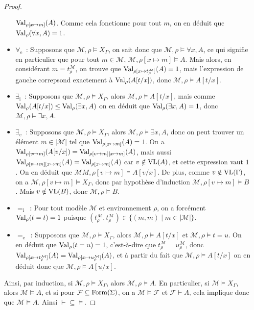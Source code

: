 \begin{proof}
\begin{itemize}
    $\operatorname{Val}_{\rho[x\mapsto m]}(A)$. Comme cela fonctionne pour tout $m$, on en
    déduit que $\operatorname{Val}_\rho(\forall x, A) = 1$.
  \item $\forall_\mathrm e$~: Supposons que $\mathcal M, \rho\models X_\Gamma$, on
    sait donc que $\mathcal M,\rho\models \forall x, A$, ce qui signifie en
    particulier que pour tout $m\in\mathcal M$,
    $\mathcal M,\rho[x\mapsto m]\models A$.
    Mais alors, en considérant $m = t^\mathcal M_\rho$, on trouve que
    $\operatorname{Val}_{\rho[x\mapsto t^\mathcal M_\rho]}(A) = 1$, mais l'expression de gauche
    correpsond exactement à $\operatorname{Val}_\rho(A[t/x])$, donc
    $\mathcal M,\rho\models A[t/x]$.
  \item $\exists_\mathrm i$~: Supposons que $\mathcal M,\rho\models X_\Gamma$,
    alors $\mathcal M,\rho\models A[t/x]$, mais comme
    $\operatorname{Val}_\rho(A[t/x])\leq\operatorname{Val}_\rho(\exists x,A)$ on en déduit que
    $\operatorname{Val}_\rho(\exists x,A) = 1$, donc $\mathcal M,\rho\models \exists x,A$.
  \item $\exists_\mathrm e$~: Supposons que $\mathcal M,\rho\models X_\Gamma$,
    alors $\mathcal M,\rho\models \exists x,A$, donc on peut trouver un élément
    $m\in|\mathcal M|$ tel que $\operatorname{Val}_{\rho[x\mapsto m]}(A) = 1$. On a
    $\operatorname{Val}_{\rho[v\mapsto m]}(A[v/x]) = \operatorname{Val}_{\rho[v\mapsto m][x\mapsto m]}(A)$, mais
    aussi $\operatorname{Val}_{\rho[v\mapsto m][x\mapsto m]}(A) = \operatorname{Val}_{\rho[x\mapsto m]}(A)$
    car $v\notin\operatorname{VL}(A)$, et cette expression vaut $1$. On en déduit que
    $\mathcal M M,\rho[v\mapsto m]\models A[v/x]$. De plus, comme
    $v\notin\operatorname{VL}(\Gamma)$, on a $\mathcal M,\rho[v\mapsto m]\models X_\Gamma$,
    donc par hypothèse d'induction $\mathcal M,\rho[v\mapsto m]\models B$.
    Mais $v\notin\operatorname{VL}(B)$, donc $\mathcal M,\rho\models B$.
  \item $=_\mathrm i$~: Pour tout modèle $\mathcal M$ et environnement $\rho$, on
    a forcément $\operatorname{Val}_\rho(t=t) = 1$ puisque
    $(t^\mathcal M_\rho,t^\mathcal M_\rho)\in\{(m,m)\mid m\in|\mathcal M|\}$.
  \item $=_\mathrm e$~: Supposons que $\mathcal M,\rho\models X_\Gamma$, alors
    $\mathcal M,\rho\models A[t/x]$ et $\mathcal M,\rho\models t = u$. On en
    déduit que $\operatorname{Val}_\rho(t = u) = 1$, c'est-à-dire que
    $t^\mathcal M_\rho = u^\mathcal M_\rho$, donc
    $\operatorname{Val}_{\rho[x\mapsto t^\mathcal M_\rho]}(A) = \operatorname{Val}_{\rho[x\mapsto u^\mathcal M_\rho]}(A)$,
    et à partir du fait que $\mathcal M,\rho\models A[t/x]$ on en déduit donc
    que $\mathcal M,\rho\models A[u/x]$.
  \end{itemize}

  Ainsi, par induction, si $\mathcal M,\rho\models X_\Gamma$, alors
  $\mathcal M,\rho\models A$. En particulier, si $\mathcal M\models X_\Gamma$,
  alors $\mathcal M\models A$, et si pour
  $\mathcal F\subseteq \operatorname{Form}(\Sigma)$, on a
  $\mathcal M\models \mathcal F$ et $\mathcal F\vdash A$, cela implique donc que
  $\mathcal M\models A$. Ainsi $\vdash\subseteq\vDash$.
\end{proof}

